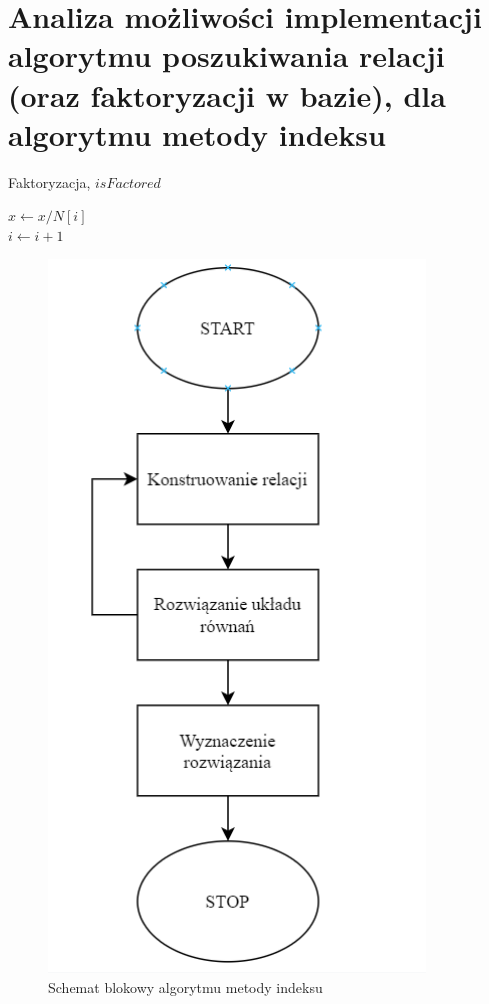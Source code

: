 \documentclass[]{article}
\begin{document}
\section{Analiza możliwości implementacji algorytmu poszukiwania relacji (oraz faktoryzacji w bazie), dla algorytmu metody indeksu}

\begin{algorithm}
	\SetAlgoLined
	\caption{Faktoryzacja, \(isFactored\)}
	\label{Faktor}
	{
		{
			\(x \gets x/N[i]\)\\
		}
		\(i \gets i + 1\)
	}
	{
	}
\end{algorithm}

\begin{figure}[H]
	\begin{center}
		\includegraphics[width=10cm]{./img/schemat_1.png}
		\caption{Schemat blokowy algorytmu metody indeksu}
	\end{center}
\end{figure}
\end{document}
